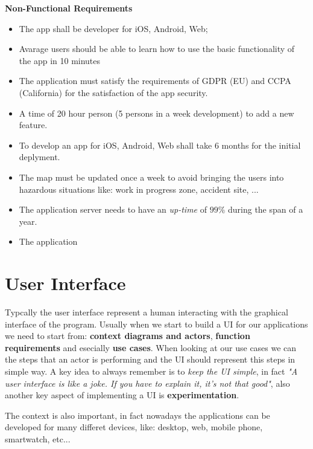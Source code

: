 \documentclass[12pt]{article}
\begin{document}
\textbf{Non-Functional Requirements}
\begin{itemize}
  \item The app shall be developer for iOS, Android, Web;
  \item Avarage users should be able to learn how to use the basic functionality of the app in 10 minutes
  \item The application must satisfy the requirements of GDPR (EU) and CCPA (California) for the satisfaction of the app security.
  \item A time of 20 hour person (5 persons in a week development) to add a new feature.
  \item To develop an app for iOS, Android, Web shall take 6 months for the initial deplyment.
  \item The map must be updated once a week to avoid bringing the users into hazardous situations like: work in progress zone, accident site, ...
  \item The application server needs to have an \emph{up-time} of $99\%$ during the span of a year.
  \item The application 
\end{itemize}





\newpage
\section{User Interface}
Typcally the user interface represent a human interacting with the graphical interface of the program. Usually when we start to build a UI for our applications we need to start from: \textbf{context diagrams and actors}, \textbf{function requirements} and esecially \textbf{use cases}. When looking at our use cases we can the steps that an actor is performing and the UI should represent this steps in simple way. A key idea to always remember is to \emph{keep the UI simple}, in fact \emph{"A user interface is like a joke. If you have to explain it, it's not that good"}, also another key aspect of implementing a UI is \textbf{experimentation}.

The context is also important, in fact nowadays the applications can be developed for many differet devices, like: desktop, web, mobile phone, smartwatch, etc...
\end{document}
